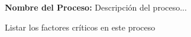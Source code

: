 


\begin{PDescripcion}
	\Ppaso \textbf{Nombre del Proceso:} Descripción del proceso...
\end{PDescripcion}


\begin{FCDescripcion}
	\FCpaso Listar los factores críticos en este proceso
\end{FCDescripcion}
